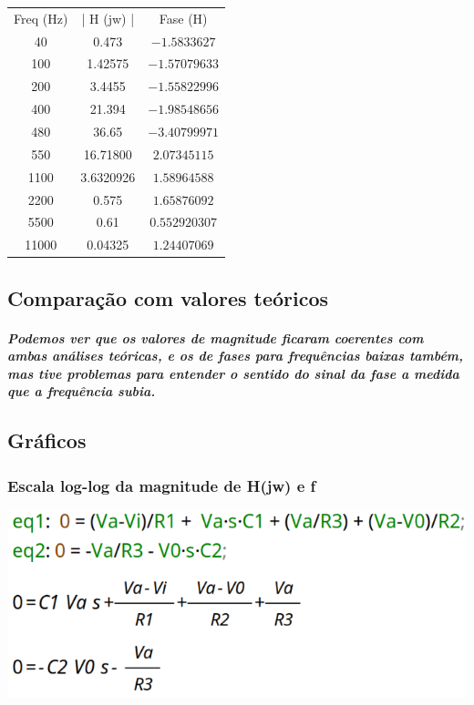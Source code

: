 \documentclass[12pt,twoside, a4paper, twocolumn]{article}
\begin{document}
\begin{center}
    \begin{tabular}{ |c|c|c| }
        \hline
        Freq (Hz) & | H (jw) | & Fase (H)      \\
        40        & 0.473      & $-1.5833627$  \\
        100       & 1.42575    & $-1.57079633$ \\
        200       & 3.4455     & $-1.55822996$ \\
        400       & 21.394     & $-1.98548656$ \\
        480       & 36.65      & $-3.40799971$ \\
        550       & 16.71800   & $2.07345115$  \\
        1100      & 3.6320926  & $ 1.58964588$ \\
        2200      & 0.575      & $1.65876092$  \\
        5500      & 0.61       & $0.552920307$ \\
        11000     & 0.04325    & $1.24407069$  \\
        \hline
    \end{tabular}
\end{center}


\subsection{Comparação com valores teóricos}


\subparagraph*{Podemos ver que os valores de magnitude ficaram coerentes com ambas análises teóricas, e os de fases para frequências baixas também, mas tive problemas para entender o sentido do sinal da fase a medida que a frequência subia.}


\subsection{Gráficos}


\subsubsection{Escala log-log da magnitude de H(jw) e f}


\begin{adjustbox}{scale=0.70}
    \includegraphics{eqs.png}
\end{adjustbox}
\end{document}
